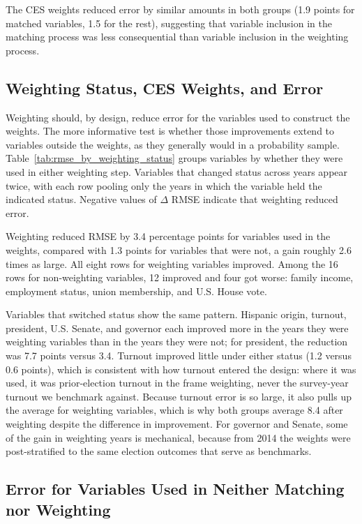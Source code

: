 \documentclass[12pt]{article}
\begin{document}
The CES weights reduced error by similar amounts in both groups (1.9 points for matched variables, 1.5 for the rest), suggesting that variable inclusion in the matching process was less consequential than variable inclusion in the weighting process. 

\subsection{Weighting Status, CES Weights, and Error}

Weighting should, by design, reduce error for the variables used to construct the weights. The more informative test is whether those improvements extend to variables outside the weights, as they generally would in a probability sample. Table~\ref{tab:rmse_by_weighting_status} groups variables by whether they were used in either weighting step. Variables that changed status across years appear twice, with each row pooling only the years in which the variable held the indicated status. Negative values of $\Delta$ RMSE indicate that weighting reduced error.
 
Weighting reduced RMSE by 3.4 percentage points for variables used in the weights, compared with 1.3 points for variables that were not, a gain roughly 2.6 times as large. All eight rows for weighting variables improved. Among the 16 rows for non-weighting variables, 12 improved and four got worse: family income, employment status, union membership, and U.S. House vote.
 
Variables that switched status show the same pattern. Hispanic origin, turnout, president, U.S. Senate, and governor each improved more in the years they were weighting variables than in the years they were not; for president, the reduction was 7.7 points versus 3.4. Turnout improved little under either status (1.2 versus 0.6 points), which is consistent with how turnout entered the design: where it was used, it was prior-election turnout in the frame weighting, never the survey-year turnout we benchmark against. Because turnout error is so large, it also pulls up the average for weighting variables, which is why both groups average 8.4 after weighting despite the difference in improvement. For governor and Senate, some of the gain in weighting years is mechanical, because from 2014 the weights were post-stratified to the same election outcomes that serve as benchmarks. 

\subsection{Error for Variables Used in Neither Matching nor Weighting}
\end{document}
